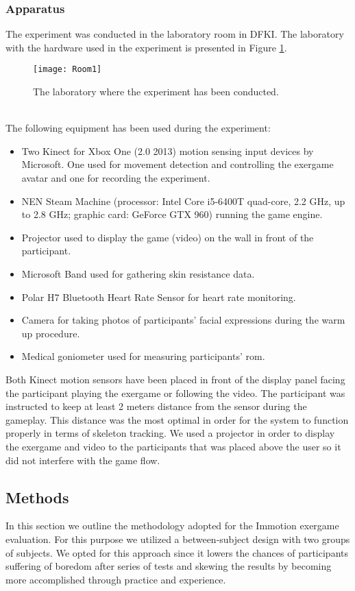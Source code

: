 \subsubsection{Apparatus}
The experiment was conducted in the laboratory room in DFKI. The laboratory with the hardware used in the experiment is presented in Figure \ref{fig:lab1}.\\ 
\begin{figure}[h]
    \centering
    \texttt{[image: Room1]}
    \caption{The laboratory where the experiment has been conducted.}
    \label{fig:lab1}
\end{figure}\\
The following equipment has been used during the experiment:
\begin{itemize}
\item Two Kinect for Xbox One (2.0 2013) motion sensing input devices by Microsoft. One used for movement detection and controlling the exergame avatar and one for recording the experiment.
\item NEN Steam Machine (processor: Intel Core i5-6400T quad-core, 2.2 GHz, up to 2.8 GHz; graphic card: GeForce GTX 960) running the game engine.
\item Projector used to display the game (video) on the wall in front of the participant.
\item Microsoft Band used for gathering skin resistance data.
\item Polar H7 Bluetooth Heart Rate Sensor for heart rate monitoring.
\item Camera for taking photos of participants' facial expressions during the warm up procedure.
\item Medical goniometer used for measuring participants' \acrshort{rom}.
\end{itemize}\pagebreak
Both Kinect motion sensors have been placed in front of the display panel facing the participant playing the exergame or following the video. The participant was instructed to keep at least 2 meters distance from the sensor during the gameplay. This distance was the most optimal in order for the system to function properly in terms of skeleton tracking.
We used a projector in order to display the exergame and video to the participants that was placed above the user so it did not interfere with the game flow.
\subsection{Methods} 
In this section we outline the methodology adopted for the Immotion exergame evaluation. For this purpose we utilized a between-subject design with two groups of subjects. We opted for this approach since it lowers the chances of participants suffering of boredom after series of tests and skewing the results by becoming more accomplished through practice and experience. 
